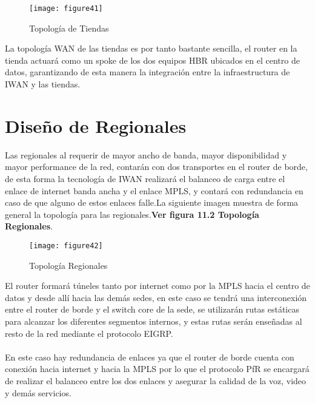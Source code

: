 \begin{figure}[htbp]
  \centering
    {\texttt{[image: figure41]}}%
  \caption{Topología de Tiendas}
  \label{fig:fig2subfig}
\end{figure}

La topología WAN de las tiendas es por tanto bastante sencilla, el router en la tienda actuará como un spoke de los dos equipos HBR ubicados en el centro de datos, garantizando de esta manera la integración entre la infraestructura de IWAN y las tiendas.

\section{Diseño de Regionales} %
\label{sec:Diseño de Regionales}

Las regionales al requerir de mayor ancho de banda, mayor disponibilidad y mayor performance de la red, contarán con dos transportes en el router de borde, de esta forma la tecnología de IWAN realizará el balanceo de carga entre el enlace de internet banda ancha y el enlace MPLS, y contará con redundancia en caso de que alguno de estos enlaces falle.La siguiente imagen muestra de forma general la topología para las regionales.\textbf{Ver figura 11.2 Topología Regionales}.

\begin{figure}[htbp]
  \centering
    {\texttt{[image: figure42]}}%
  \caption{Topología Regionales}
  \label{fig:fig2subfig}
\end{figure}

El router formará túneles tanto por internet como por la MPLS hacia el centro de datos y desde allí hacia las demás sedes, en este caso se tendrá una interconexión entre el router de borde y el switch core de la sede, se utilizarán rutas estáticas para alcanzar los diferentes segmentos internos, y estas rutas serán enseñadas al resto de la red mediante el protocolo EIGRP.
\\
\\
En este caso hay redundancia de enlaces ya que el router de borde cuenta con conexión hacia internet y hacia la MPLS por lo que el protocolo PfR se encargará de realizar el balanceo entre los dos enlaces y asegurar la calidad de la voz, video y demás servicios.


